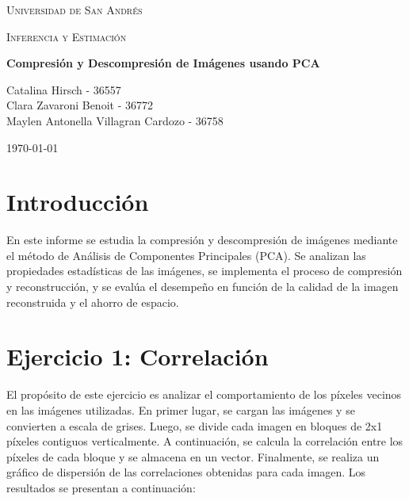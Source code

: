 \documentclass[a4paper,12pt]{article}
\numberwithin{equation}{section}
\numberwithin{figure}{section}
\begin{document}
\noindent
\begin{minipage}{\textwidth}
    \centering
    {\scshape\LARGE Universidad de San Andrés \par}
    \vspace{1.2cm}
    {\scshape\Large Inferencia y Estimación\par}
    \vspace{1.2cm}
    {\huge\bfseries Compresión y Descompresión de Imágenes usando PCA\par}
    \vspace{1.5cm}
    {\large
    Catalina Hirsch - 36557 \\ Clara Zavaroni Benoit - 36772 \\ Maylen Antonella Villagran Cardozo - 36758 \\}
    \vspace{1cm}
    {\large \today\par}
\end{minipage}



\begin{abstract}
La realización de este trabajo práctico tiene como objetivo aplicar el método de \textbf{Análisis de Componentes Principales (PCA)} en la compresión de imágenes. Se busca reducir el espacio de almacenamiento minimizando la pérdida de información, conservando los datos que contienen la mayor parte de la varianza. Posteriormente, se descomprime la imagen y se compara con la original para evaluar la calidad de la compresión, utilizando métricas objetivas. El desempeño se evalúa en función de la cantidad de componentes principales utilizados. Finalmente, se discuten los resultados y conclusiones obtenidas.
\end{abstract}


\section{Introducción}
En este informe se estudia la compresión y descompresión de imágenes mediante el método de Análisis de Componentes Principales (PCA). Se analizan las propiedades estadísticas de las imágenes, se implementa el proceso de compresión y reconstrucción, y se evalúa el desempeño en función de la calidad de la imagen reconstruida y el ahorro de espacio.

\section{Ejercicio 1: Correlación}
El propósito de este ejercicio es analizar el comportamiento de los píxeles vecinos en las imágenes utilizadas. En primer lugar, se cargan las imágenes y se convierten a escala de grises. Luego, se divide cada imagen en bloques de 2x1 píxeles contiguos verticalmente. A continuación, se calcula la correlación entre los píxeles de cada bloque y se almacena en un vector. Finalmente, se realiza un gráfico de dispersión de las correlaciones obtenidas para cada imagen. Los resultados se presentan a continuación:
\end{document}
